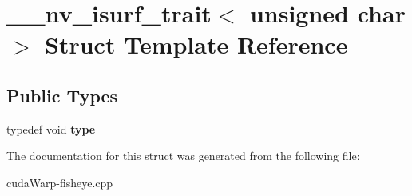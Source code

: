 \hypertarget{struct____nv__isurf__trait_3_01unsigned_01char_01_4}{}\section{\+\_\+\+\_\+nv\+\_\+isurf\+\_\+trait$<$ unsigned char $>$ Struct Template Reference}
\label{struct____nv__isurf__trait_3_01unsigned_01char_01_4}
\subsection*{Public Types}
\begin{DoxyCompactItemize}
\item 
typedef void {\bfseries type}\hypertarget{struct____nv__isurf__trait_3_01unsigned_01char_01_4_a4708db1e368fb2de5a6437ce3ad93895}{}\label{struct____nv__isurf__trait_3_01unsigned_01char_01_4_a4708db1e368fb2de5a6437ce3ad93895}

\end{DoxyCompactItemize}


The documentation for this struct was generated from the following file\+:\begin{DoxyCompactItemize}
\item 
cuda\+Warp-\/fisheye.\+cpp\end{DoxyCompactItemize}
